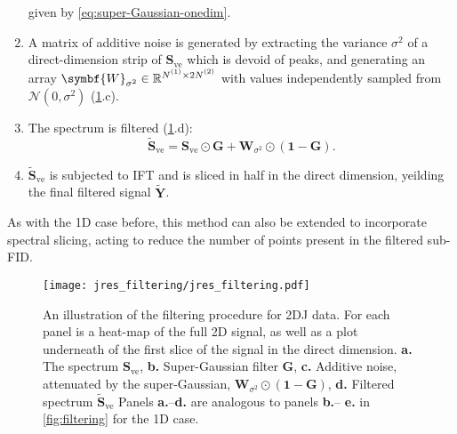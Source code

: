 \begin{enumerate}
        given by \cref{eq:super-Gaussian-onedim}.
    \item A matrix of additive noise is generated by extracting the variance
        $\sigma^2$ of a direct-dimension strip of $\symbf{S}_{\text{ve}}$ which
        is devoid of peaks, and generating an array $\symbf{W}_{\sigma^2} \in
        \mathbb{R}^{\None \times 2 \Ntwo}$ with values independently sampled
        from $\mathcal{N}(0, \sigma^2)$ (\cref{fig:jres-filtering}.c).
    \item The spectrum is filtered (\cref{fig:jres-filtering}.d):
        \begin{equation}
            \widetilde{\symbf{S}}_{\text{ve}} = \symbf{S}_{\text{ve}} \odot
            \symbf{G} + \symbf{W}_{\sigma^2} \odot (\symbf{1} - \symbf{G}).
        \end{equation}
    \item $\widetilde{\symbf{S}}_{\text{ve}}$ is subjected to \ac{IFT} and is
        sliced in half in the direct dimension, yeilding the final filtered
        signal $\widetilde{\symbf{Y}}$.
\end{enumerate}
As with the \ac{1D} case before, this method can also be extended to
incorporate spectral slicing, acting to reduce the number of points present in
the filtered sub-\ac{FID}.

\begin{figure}
    \centering
    \texttt{[image: jres\_filtering/jres\_filtering.pdf]}
    \caption[
        An illustration of the filtering procedure for \ac{2DJ} data.
    ]
    {
        An illustration of the filtering procedure for \ac{2DJ} data.
        For each panel is a heat-map of the full \ac{2D} signal, as well as a
        plot underneath of the first slice of the signal in the direct
        dimension.
        \textbf{a.} The spectrum $\symbf{S}_{\text{ve}}$,
        \textbf{b.} Super-Gaussian filter $\symbf{G}$,
        \textbf{c.} Additive noise, attenuated by the super-Gaussian, $\symbf{W}_{\sigma^2} \odot (\symbf{1} - \symbf{G})$,
        \textbf{d.} Filtered spectrum $\widetilde{\symbf{S}}_{\text{ve}}$
        Panels \textbf{a.}--\textbf{d.} are analogous to panels \textbf{b.}--
        \textbf{e.} in \cref{fig:filtering} for the \ac{1D} case.
    }
    \label{fig:jres-filtering}
\end{figure}


